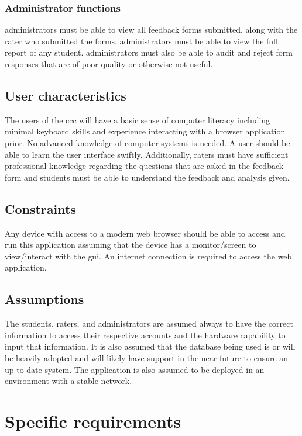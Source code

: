 \documentclass[letterpaper,article,oneside]{memoir}
\begin{document}
\subsection{Administrator functions}

\Glspl{administrator} must be able to view all \glspl{feedback form} submitted, along with the \gls{rater} who submitted the forms.
\Glspl{administrator} must be able to view the \gls{full report} of any \gls{student}.
\Glspl{administrator} must also be able to audit and reject \glspl{form response} that are of poor quality or otherwise not useful.

\section{User characteristics}

The \glspl{user} of the \gls{ccc} will have a basic sense of computer literacy including minimal keyboard skills and experience interacting with a browser application prior.
No advanced knowledge of computer systems is needed.
A \gls{user} should be able to learn the \gls{user} interface swiftly.
Additionally, \glspl{rater} must have sufficient professional knowledge regarding the questions that are asked in the \gls{feedback form} and \glspl{student} must be able to understand the feedback and analysis given.

\section{Constraints}
Any device with access to a modern web browser should be able to access and run this application assuming that the device has a monitor/screen to view/interact with the \gls{gui}.
An internet connection is required to access the web application.

\section{Assumptions}
The \glspl{student}, \glspl{rater}, and \glspl{administrator} are assumed always to have the correct information to access their respective accounts and the hardware capability to input that information.
It is also assumed that the database being used is or will be heavily adopted and will likely have support in the near future to ensure an up-to-date system.
The application is also assumed to be deployed in an environment with a stable network.

\chapter{Specific requirements}
\end{document}
